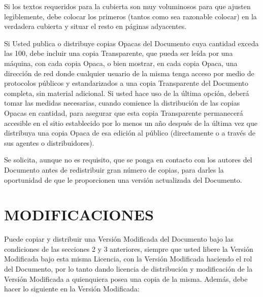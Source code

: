 \documentclass[letterpaper,12pt,titlepage]{article}
\begin{document}
Si los textos requeridos para la cubierta son muy voluminosos para que ajusten legiblemente, debe colocar los primeros (tantos como sea razonable colocar) en la verdadera cubierta y situar el resto en páginas adyacentes.\par

Si Usted publica o distribuye copias Opacas del Documento cuya cantidad exceda las 100, debe incluir una copia Transparente, que pueda ser leída por una máquina, con cada copia Opaca, o bien mostrar, en cada copia Opaca, una dirección de red donde cualquier usuario de la misma tenga acceso por medio de protocolos públicos y estandarizados a una copia Transparente del Documento completa, sin material adicional. Si usted hace uso de la última opción, deberá tomar las medidas necesarias, cuando comience la distribución de las copias Opacas en cantidad, para asegurar que esta copia Transparente permanecerá accesible en el sitio establecido por lo menos un año después de la última vez que distribuya una copia Opaca de esa edición al público (directamente o a través de sus agentes o distribuidores).\par

Se solicita, aunque no es requisito, que se ponga en contacto con los autores del Documento antes de redistribuir gran número de copias, para darles la oportunidad de que le proporcionen una versión actualizada del Documento.\par

\section{MODIFICACIONES}

Puede copiar y distribuir una Versión Modificada del Documento bajo las condiciones de las secciones 2 y 3 anteriores, siempre que usted libere la Versión Modificada bajo esta misma Licencia, con la Versión Modificada haciendo el rol del Documento, por lo tanto dando licencia de distribución y modificación de la Versión Modificada a quienquiera posea una copia de la misma. Además, debe hacer lo siguiente en la Versión Modificada:\par
\end{document}
